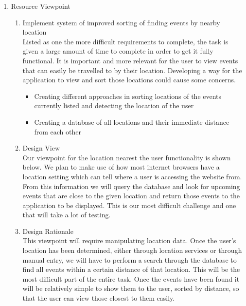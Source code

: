 \documentclass[draftclsnofoot,10pt,onecolumn]{IEEEtran} %
\begin{document}
\begin{enumerate}
\begin{enumerate}
		\item Resource Viewpoint \\
			\begin{enumerate}
				\item Implement system of improved sorting of finding events by nearby location \\
				Listed as one the more difficult requirements to complete, the task is given a large amount of time to
				complete in order to get it fully functional. It is important and more relevant for the user to view events that
				can easily be travelled to by their location. Developing a way for the application to view and sort those
				locations could cause some concerns.
				\begin{itemize}
					\item Creating different approaches in sorting locations of the events currently listed and detecting the
					location of the user
					\item Creating a database of all locations and their immediate distance from each other \\
				\end{itemize}
				
				\item Design View \\ %
				Our viewpoint for the location nearest the user functionality is shown below. We plan to make use of how
				most internet browsers have a location setting which can tell where a user is accessing the website from.
				From this information we will query the database and look for upcoming events that are close to the given
				location and return those events to the application to be displayed. This is our most difficult challenge and
				one that will take a lot of testing. \\
					
				\item Design Rationale \\
				This viewpoint will require manipulating location data. Once the user's location has been determined, either
				through location services or through manual entry, we will have to perform a search through the database to
				find all events within a certain distance of that location. This will be the most difficult part of the entire
				task. Once the events have been found it will be relatively simple to show them to the user, sorted by
				distance, so that the user can view those closest to them easily. \\
			\end{enumerate}
			

\end{enumerate}
\end{enumerate}
\end{document}
